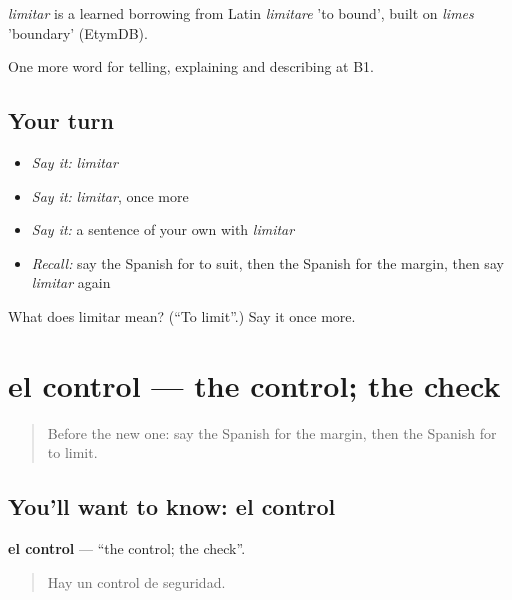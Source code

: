 \begin{cousinweb}
\emph{limitar} is a learned borrowing from Latin \emph{limitare} 'to bound', built on \emph{limes} 'boundary' (EtymDB).
\end{cousinweb}

\begin{grammarlens}[title={What you've built}]
One more word for telling, explaining and describing at B1.
\end{grammarlens}

\subsection*{Your turn}
\begin{itemize}
\raggedright
  \item \emph{Say it:} \emph{limitar}
  \item \emph{Say it:} \emph{limitar}, once more
  \item \emph{Say it:} a sentence of your own with \emph{limitar}
  \item \emph{Recall:} say the Spanish for to suit, then the Spanish for the margin, then say \emph{limitar} again
\end{itemize}

\begin{tcolorbox}[breakable,colback=teal!4,colframe=teal!35!black,title={Before you move on}]
What does limitar mean? (\textquotedblleft{}To limit\textquotedblright{}.) Say it once more.
\end{tcolorbox}
\section[el control]{el control — the control; the check}

\label{lesson:ES-C638-control}



\begin{quote}
Before the new one: say the Spanish for the margin, then the Spanish for to limit.
\end{quote}

\subsection*{You'll want to know: el control}
\textbf{el control} — \textquotedblleft{}the control; the check\textquotedblright{}.

\begin{quote}
Hay un control de seguridad.
\end{quote}

